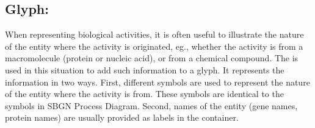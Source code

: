 \subsection{Glyph: }
\label{sec:af:unitInfo}

When representing biological activities, it is often useful to illustrate the nature of the entity where the activity is originated, eg., whether the activity is from a macromolecule (protein or nucleic acid), or from a chemical compound.  The \SBGNAFLone {} is used in this situation to add such information to a glyph.  It represents the information in two ways.  First, different symbols are used to represent the nature of the entity where the activity is from.  These symbols are identical to the  symbols in SBGN Process Diagram.  Second, names of the entity (gene names, protein names) are usually provided as labels in the  container.

